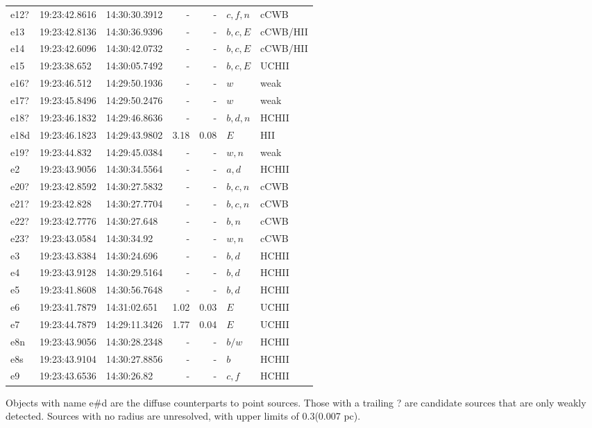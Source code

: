 \begin{table*}[htp]
\begin{tabular}{lllrrll}
e12? & 19:23:42.8616 & 14:30:30.3912 & - & - & $c,f,n$ & cCWB \\
e13 & 19:23:42.8136 & 14:30:36.9396 & - & - & $b,c,E$ & cCWB/HII \\
e14 & 19:23:42.6096 & 14:30:42.0732 & - & - & $b,c,E$ & cCWB/HII \\
e15 & 19:23:38.652 & 14:30:05.7492 & - & - & $b,c,E$ & UCHII \\
e16? & 19:23:46.512 & 14:29:50.1936 & - & - & $w$ & weak \\
e17? & 19:23:45.8496 & 14:29:50.2476 & - & - & $w$ & weak \\
e18? & 19:23:46.1832 & 14:29:46.8636 & - & - & $b,d,n$ & HCHII \\
e18d & 19:23:46.1823 & 14:29:43.9802 & 3.18 & 0.08 & $E$ & HII \\
e19? & 19:23:44.832 & 14:29:45.0384 & - & - & $w,n$ & weak \\
e2 & 19:23:43.9056 & 14:30:34.5564 & - & - & $a,d$ & HCHII \\
e20? & 19:23:42.8592 & 14:30:27.5832 & - & - & $b,c,n$ & cCWB \\
e21? & 19:23:42.828 & 14:30:27.7704 & - & - & $b,c,n$ & cCWB \\
e22? & 19:23:42.7776 & 14:30:27.648 & - & - & $b,n$ & cCWB \\
e23? & 19:23:43.0584 & 14:30:34.92 & - & - & $w,n$ & cCWB \\
e3 & 19:23:43.8384 & 14:30:24.696 & - & - & $b,d$ & HCHII \\
e4 & 19:23:43.9128 & 14:30:29.5164 & - & - & $b,d$ & HCHII \\
e5 & 19:23:41.8608 & 14:30:56.7648 & - & - & $b,d$ & HCHII \\
e6 & 19:23:41.7879 & 14:31:02.651 & 1.02 & 0.03 & $E$ & UCHII \\
e7 & 19:23:44.7879 & 14:29:11.3426 & 1.77 & 0.04 & $E$ & UCHII \\
e8n & 19:23:43.9056 & 14:30:28.2348 & - & - & $b/w$ & HCHII \\
e8s & 19:23:43.9104 & 14:30:27.8856 & - & - & $b$ & HCHII \\
e9 & 19:23:43.6536 & 14:30:26.82 & - & - & $c,f$ & HCHII \\
\hline
\end{tabular}
\par
Objects with name e\#d are the diffuse counterparts to point sources.  Those with a trailing ? are candidate sources that are only weakly detected.   Sources with no radius are unresolved, with upper limits of 0.3\arcsec (0.007 pc).\\

\end{table*}
